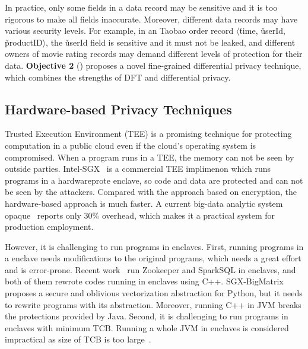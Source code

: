 In practice, only some fields in a data record may be sensitive and it is too 
rigorous to make all fields inaccurate. Moreover, different data records may 
have various security levels. For example, in an Taobao order record 
$\langle$\v{time}, \v{userId}, \v{productID}$\rangle$, the \v{userId} field is 
sensitive and it must not be leaked, and different owners of movie rating 
records may demand different levels of protection for their 
data. \textbf{Objective 2} () 
proposes a novel fine-grained differential privacy technique, which combines  
the strengths of DFT and differential privacy.



\vspace{-.15in}\subsection{Hardware-based Privacy Techniques}
\label{sec:sgx}\vspace{-.075in}

Trusted Execution Environment (TEE) is a promising technique for
protecting computation in a public cloud even if the cloud's operating system 
is compromised. When a program runs in a TEE, the memory can 
not be seen by outside parties. Intel-SGX~\cite{intel-sgx} is a commercial TEE 
implimenon which runs programs in a hardwareprote enclave, so code and data 
are protected and can not be seen by the attackers.
Compared with the approach based on encryption, the hardware-based approach is 
much
faster. A current big-data analytic
system opaque~\cite{opaque:nsdi17} reports only 30\% overhead, which makes it
a practical system for production employment.

However, it is challenging to run programs in enclaves. First,
running programs in a enclave needs modifications to the original
programs, which needs a great effort and is error-prone. Recent
work~\cite{securekeeper,opaque:nsdi17} run Zookeeper and SparkSQL in enclaves,
and both of them rewrote codes running in enclaves using C++.
SGX-BigMatrix~\cite{bigmatrix:ccs17} proposes a secure and oblivious 
vectorization
abstraction for Python, but it needs to rewrite programs with its abstraction.
Moreover, running C++ in JVM breaks the protections
provided by Java. Second, it is challenging to run programs in enclaves with 
minimum
TCB. Running a whole JVM in enclaves is considered impractical as size of TCB
is too large~\cite{securekeeper}.

